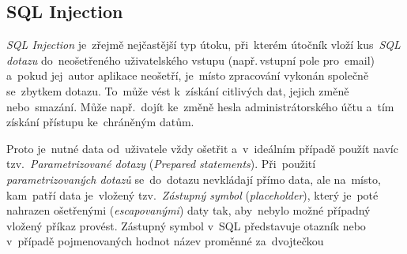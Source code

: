 \documentclass[11pt,a4paper]{report}
\begin{document}
            \subsection{SQL Injection}
                \emph{SQL Injection} je~zřejmě nejčastější typ útoku, při~kterém útočník vloží kus~\emph{SQL dotazu} do~neošetřeného uživatelského vstupu (např.\,vstupní pole pro~email) a~pokud jej~autor aplikace neošetří, je~místo zpracování vykonán společně se~zbytkem dotazu. To~může vést k~získání citlivých dat, jejich změně nebo~smazání. Může např.~dojít ke~změně hesla administrátorského účtu a~tím získání přístupu ke~chráněným datům.

                Proto je~nutné data od~uživatele vždy ošetřit a~v~ideálním případě použít navíc tzv.~\emph{Parametrizované dotazy} (\emph{Prepared statements}). Při~použití \emph{parametrizovaných dotazů} se~do~dotazu nevkládají přímo data, ale na~místo, kam~patří data je~vložený tzv.~\emph{Zástupný symbol} (\emph{placeholder}), který je~poté nahrazen ošetřenými (\emph{escapovanými}) daty tak, aby~nebylo možné případný vložený příkaz provést. Zástupný symbol v~SQL představuje otazník  nebo v~případě pojmenovaných hodnot název proměnné za~dvojtečkou  \cite{graham2021ethical}
                
\end{document}
